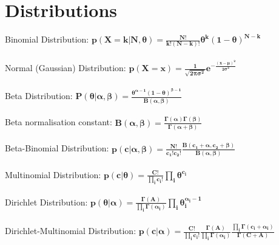 \documentclass{article}
\begin{document}
\section{Distributions}
Binomial Distribution: $\mathbf{p(X = k|N,\theta) = \frac{N!}{k!(N-k)!}\theta^k(1-\theta)^{N-k}}$\\\\
Normal (Gaussian) Distribution: $\mathbf{p(X = x) = \frac{1}{\sqrt{2\pi \sigma ^2}} e^{-\frac{(x-\mu )^2}{2\sigma ^2}}}$\\\\
Beta Distribution: $\mathbf{P(\theta |\alpha ,\beta ) = \frac{\theta^{\alpha - 1}(1-\theta )^{\beta - 1}}{B(\alpha , \beta)}}$\\\\
Beta normalisation constant: $\mathbf{B(\alpha,\beta) = \frac{\Gamma(\alpha)\Gamma(\beta)}{\Gamma(\alpha+\beta)}}$\\\\
Beta-Binomial Distribution: $\mathbf{p(c|\alpha,\beta) = \frac{N!}{c_1!c_2!}\frac{B(c_1 + \alpha, c_2 + \beta)}{B(\alpha,\beta)}}$\\\\
Multinomial Distribution: $\mathbf{p(c|\theta) = \frac{C!}{\prod_{i}^{}c_i!}\prod_{i}^{}\theta^{c_i}}$\\\\
Dirichlet Distribution: $\mathbf{p(\theta|\alpha) = \frac{\Gamma(A)}{\prod_{i}^{}\Gamma(\alpha_i)}\prod_{i}^{}\theta_i^{\alpha_i-1}}$\\\\
Dirichlet-Multinomial Distribution: $\mathbf{p(c|\alpha) = \frac{C!}{\prod_{i}^{}c_i!}\frac{\Gamma(A)}{\prod_{i}^{}\Gamma(\alpha_i)}\frac{\prod_{i}^{}\Gamma(c_i+\alpha_i)}{\Gamma(C+A)}}$
\end{document}
